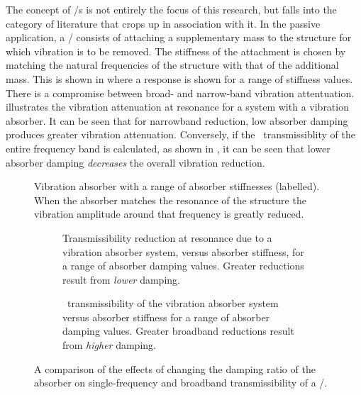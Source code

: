 The concept of \vibneut/s is not entirely the focus of this research, but falls into the category of literature that crops up in association with it.
In the passive application, a \vibneut/ consists of attaching a supplementary mass to the structure for which vibration is to be removed.
The stiffness of the attachment is chosen by matching the natural frequencies of the structure with that of the additional mass.
This is shown in  where a response is shown for a range of stiffness values.
There is a compromise between broad- and narrow-band vibration attentuation.
 illustrates the vibration attenuation at resonance for a system with a vibration absorber.
It can be seen that for narrowband reduction, low absorber damping produces greater vibration attenuation.
Conversely, if the \RMS\ transmissiblity of the entire frequency band is calculated, as shown in , it can be seen that lower absorber damping \emph{decreases} the overall vibration reduction.

\begin{figure}
   \caption{
     Vibration absorber with a range of absorber stiffnesses (labelled).
     When the absorber matches the resonance of the structure the vibration amplitude around that frequency is greatly reduced.}
\end{figure}

\begin{figure}
\begin{wide}
  \begin{subfigure}
    \caption{
      Transmissibility reduction at resonance due to a vibration absorber system, versus absorber stiffness, for a range of absorber damping values.
      Greater reductions result from \emph{lower} damping.}
  \end{subfigure}
  \begin{subfigure}
    \caption{
      \RMS\ transmissibility of the vibration absorber system versus absorber stiffness for a range of absorber damping values.
    Greater broadband reductions result from \emph{higher} damping.}
  \end{subfigure}
\end{wide}
\caption{
  A comparison of the effects of changing the damping ratio of the absorber on single-frequency and broadband transmissibility of a \vibneut/.
}
\end{figure}


